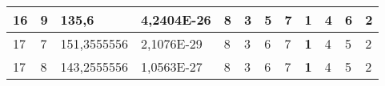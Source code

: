 \documentclass[conference]{IEEEtran}
\begin{document}
\begin{table*}[]
\begin{tabular}{|llll|llllllll|}
\multicolumn{1}{|l|}{16}                                                             & \multicolumn{1}{l|}{9}                                                                 & \multicolumn{1}{l|}{135,6}                                                                 & 4,2404E-26                              & \multicolumn{1}{l|}{8}                                                           & \multicolumn{1}{l|}{3}                                                           & \multicolumn{1}{l|}{5}                                                           & \multicolumn{1}{l|}{7}                                                           & \multicolumn{1}{l|}{\textbf{1}}                                                  & \multicolumn{1}{l|}{4}                                                           & \multicolumn{1}{l|}{6}                                                           & 2                                   \\ \hline
\multicolumn{1}{|l|}{17}                                                             & \multicolumn{1}{l|}{7}                                                                 & \multicolumn{1}{l|}{151,3555556}                                                           & 2,1076E-29                              & \multicolumn{1}{l|}{8}                                                           & \multicolumn{1}{l|}{3}                                                           & \multicolumn{1}{l|}{6}                                                           & \multicolumn{1}{l|}{7}                                                           & \multicolumn{1}{l|}{\textbf{1}}                                                  & \multicolumn{1}{l|}{4}                                                           & \multicolumn{1}{l|}{5}                                                           & 2                                   \\ \hline
\multicolumn{1}{|l|}{17}                                                             & \multicolumn{1}{l|}{8}                                                                 & \multicolumn{1}{l|}{143,2555556}                                                           & 1,0563E-27                              & \multicolumn{1}{l|}{8}                                                           & \multicolumn{1}{l|}{3}                                                           & \multicolumn{1}{l|}{6}                                                           & \multicolumn{1}{l|}{7}                                                           & \multicolumn{1}{l|}{\textbf{1}}                                                  & \multicolumn{1}{l|}{4}                                                           & \multicolumn{1}{l|}{5}                                                           & 2                                   \\ \hline

\end{tabular}
\end{table*}
\end{document}
